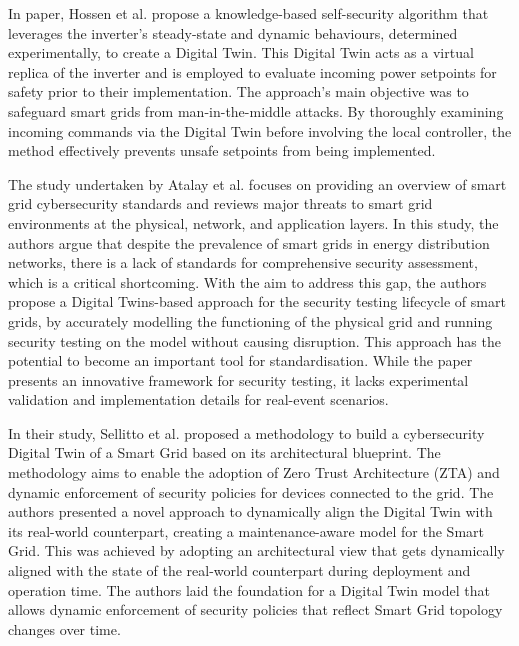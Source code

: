 
In\cite{hossenDigitalTwinSelfSecurity2021} paper, Hossen et al. propose a knowledge-based self-security algorithm that leverages the inverter's steady-state and dynamic behaviours, determined experimentally, to create a Digital Twin. This Digital Twin acts as a virtual replica of the inverter and is employed to evaluate incoming power setpoints for safety prior to their implementation. The approach's main objective was to safeguard smart grids from man-in-the-middle attacks. By thoroughly examining incoming commands via the Digital Twin before involving the local controller, the method effectively prevents unsafe setpoints from being implemented.

The study undertaken by Atalay et al.\cite{atalayDigitalTwinsApproach2020} focuses on providing an overview of smart grid cybersecurity standards and reviews major threats to smart grid environments at the physical, network, and application layers. In this study, the authors argue that despite the prevalence of smart grids in energy distribution networks, there is a lack of standards for comprehensive security assessment, which is a critical shortcoming. With the aim to address this gap, the authors propose a Digital Twins-based approach for the security testing lifecycle of smart grids, by accurately modelling the functioning of the physical grid and running security testing on the model without causing disruption. This approach has the potential to become an important tool for standardisation. While the paper presents an innovative framework for security testing, it lacks experimental validation and implementation details for real-event scenarios.


In their study, Sellitto et al.\cite{giovannipaolosellittoEnablingZeroTrust2021} proposed a methodology to build a cybersecurity Digital Twin of a Smart Grid based on its architectural blueprint. The methodology aims to enable the adoption of Zero Trust Architecture (ZTA) and dynamic enforcement of security policies for devices connected to the grid. The authors presented a novel approach to dynamically align the Digital Twin with its real-world counterpart, creating a maintenance-aware model for the Smart Grid. This was achieved by adopting an architectural view that gets dynamically aligned with the state of the real-world counterpart during deployment and operation time. The authors laid the foundation for a Digital Twin model that allows dynamic enforcement of security policies that reflect Smart Grid topology changes over time. 


